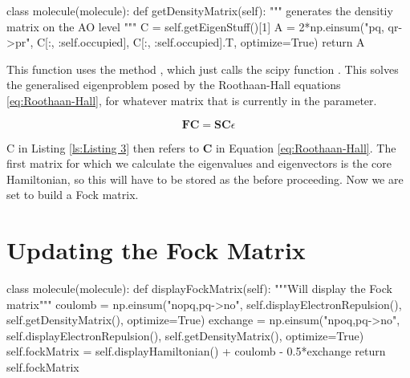  
\begin{python}[caption={calculating the density matrix},label={ls:Listing 3}]
        class molecule(molecule):
            def getDensityMatrix(self):
                """
                generates the densitiy matrix on the AO level
                """
                C = self.getEigenStuff()[1]
                A = 2*np.einsum("pq, qr->pr", C[:, :self.occupied], 
                                C[:, :self.occupied].T, optimize=True)
                return A
\end{python}

This function uses the method , which just calls 
the scipy function . This solves the generalised 
eigenproblem posed by the Roothaan-Hall equations \eqref{eq:Roothaan-Hall}, 
for whatever matrix that is currently in the  
parameter.

\begin{equation}\label{eq:Roothaan-Hall}
    \boldsymbol{FC} = \boldsymbol{SC}\epsilon
\end{equation}

C in Listing \ref{ls:Listing 3} then refers to \textbf{C} in Equation 
\eqref{eq:Roothaan-Hall}. The first matrix for which we calculate the eigenvalues 
and eigenvectors is the core Hamiltonian, so this will have to be stored as the 
 before proceeding. Now we are set to build a Fock 
matrix.

\section{Updating the Fock Matrix}
\label{sec:step4}


    
\begin{python}[caption={calculating the Fock matrix},label={ls:Listing 4}]
    class molecule(molecule):
        def displayFockMatrix(self):
            """Will display the Fock matrix"""
            coulomb = np.einsum("nopq,pq->no", 
                    self.displayElectronRepulsion(), 
                    self.getDensityMatrix(), optimize=True)
            exchange = np.einsum("npoq,pq->no", 
                    self.displayElectronRepulsion(), 
                    self.getDensityMatrix(), optimize=True)
            self.fockMatrix = self.displayHamiltonian() 
                            + coulomb - 0.5*exchange
            return self.fockMatrix
\end{python}
 
